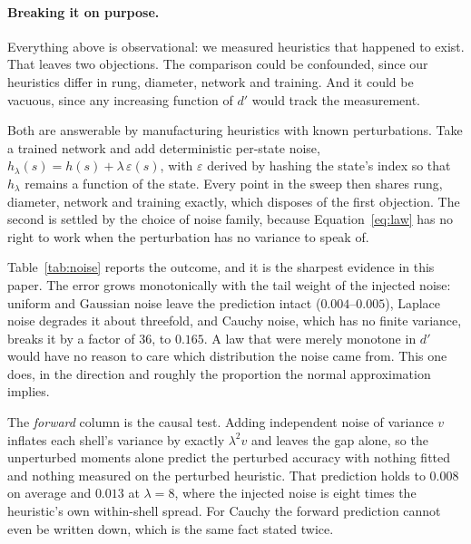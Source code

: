 \documentclass{article}
\begin{document}
\paragraph{Breaking it on purpose.} Everything above is observational: we
measured heuristics that happened to exist. That leaves two objections. The
comparison could be confounded, since our heuristics differ in rung, diameter,
network and training. And it could be vacuous, since any increasing function of
$d'$ would track the measurement.

Both are answerable by manufacturing heuristics with known perturbations. Take a
trained network and add deterministic per-state noise,
$h_\lambda(s) = h(s) + \lambda\,\varepsilon(s)$, with $\varepsilon$ derived by
hashing the state's index so that $h_\lambda$ remains a function of the state.
Every point in the sweep then shares rung, diameter, network and training exactly,
which disposes of the first objection. The second is settled by the choice of
noise family, because Equation~\ref{eq:law} has no right to work when the
perturbation has no variance to speak of.

\begin{table}[t]\centering
\caption{Injecting calibrated noise into a trained heuristic on rung $k=6$.
\emph{Measured} recomputes both moments from the perturbed heuristic;
\emph{forward} predicts accuracy from the unperturbed moments plus the analytic
variance inflation $\lambda^2\mathrm{Var}(\varepsilon)$, touching the perturbed
heuristic only to score it.}
\label{tab:noise}\end{table}

Table~\ref{tab:noise} reports the outcome, and it is the sharpest evidence in
this paper. The error grows monotonically with the tail weight of the injected
noise: uniform and Gaussian noise leave the prediction intact
($0.004$--$0.005$), Laplace noise degrades it about threefold, and Cauchy noise,
which has no finite variance, breaks it by a factor of $36$, to $0.165$.
A law that were merely monotone in $d'$ would have no reason to care which
distribution the noise came from. This one does, in the direction and roughly the
proportion the normal approximation implies.

The \emph{forward} column is the causal test. Adding independent noise of
variance $v$ inflates each shell's variance by exactly $\lambda^2 v$ and leaves
the gap alone, so the unperturbed moments alone predict the perturbed accuracy
with nothing fitted and nothing measured on the perturbed heuristic. That
prediction holds to $0.008$ on average and $0.013$ at $\lambda = 8$, where the
injected noise is eight times the heuristic's own within-shell spread. For Cauchy
the forward prediction cannot even be written down, which is the same fact
stated twice.
\end{document}
